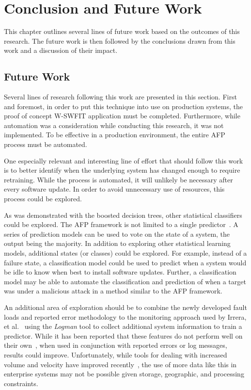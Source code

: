\chapter{Conclusion and Future Work} \label{chapter5}
This chapter outlines several lines of future work based on the outcomes of
this research.  The future work is then followed by the conclusions drawn from
this work and a discussion of their impact.

\section{Future Work}
Several lines of research following this work are presented in this section.
First and foremost, in order to put this technique into use on production
systems, the proof of concept \ac{W-SWFIT} application must be completed.
Furthermore, while automation was a consideration while conducting this
research, it was not implemented.  To be effective in a production environment,
the entire \ac{AFP} process must be automated.

One especially relevant and interesting line of effort that should follow this
work is to better identify when the underlying system has changed enough to
require retraining.  While the process is automated, it will unlikely be
necessary after every software update.  In order to avoid unnecessary use of
resources, this process could be explored.

As was demonstrated with the boosted decision trees, other statistical
classifiers could be explored.  The \ac{AFP} framework is not limited to a
single predictor~\cite{irrera2015}.  A series of prediction models can be used
to vote on the state of a system, the output being the majority.  In addition
to exploring other statistical learning models, additional states (or classes)
could be explored.  For example, instead of a failure state, a classification
model could be used to predict when a system would be idle to know when best to
install software updates.  Further, a classification model may be able to
automate the classification and prediction of when a target was under a
malicious attack in a method similar to the \ac{AFP} framework.

An additional area of exploration should be to combine the newly developed
fault loads and reported error methodology to the monitoring approach used by
Irrera, et al.~\cite{irrera2015} using the \emph{Logman} tool to collect
additional system information to train a predictor.  While it has been reported
that these features do not perform well on their own~\cite{salfnerSurvey}, when
used in conjunction with reported errors or log messages, results could
improve.  Unfortunately, while tools for dealing with increased volume and
velocity have improved recently~\cite{meng2016}, the use of more data like this
in enterprise systems may not be possible given storage, geographic, and
processing constraints.

